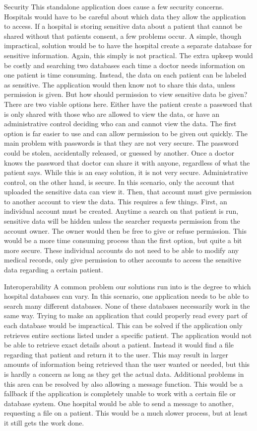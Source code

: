 \documentclass[14pt]{article}
\begin{document}
Security
This standalone application does cause a few security concerns. Hospitals would have to be careful about which data they allow the application to access. If a hospital is storing sensitive data about a patient that cannot be shared without that patients consent, a few problems occur. A simple, though impractical, solution would be to have the hospital create a separate database for sensitive information. Again, this simply is not practical. The extra upkeep would be costly and searching two databases each time a doctor needs information on one patient is time consuming. Instead, the data on each patient can be labeled as sensitive. The application would then know not to share this data, unless permission is given. But how should permission to view sensitive data be given? There are two viable options here. Either have the patient create a password that is only shared with those who are allowed to view the data, or have an administrative control deciding who can and cannot view the data. The first option is far easier to use and can allow permission to be given out quickly. The main problem with passwords is that they are not very secure. The password could be stolen, accidentally released, or guessed by another. Once a doctor knows the password that doctor can share it with anyone, regardless of what the patient says. While this is an easy solution, it is not very secure. Administrative control, on the other hand, is secure. In this scenario, only the account that uploaded the sensitive data can view it. Then, that account must give permission to another account to view the data. This requires a few things. First, an individual account must be created. Anytime a search on that patient is run, sensitive data will be hidden unless the searcher requests permission from the account owner. The owner would then be free to give or refuse permission. This would be a more time consuming process than the first option, but quite a bit more secure. These individual accounts do not need to be able to modify any medical records, only give permission to other accounts to access the sensitive data regarding a certain patient.

Interoperability
A common problem our solutions run into is the degree to which hospital databases can vary. In this scenario, one application needs to be able to search many different databases. None of these databases necessarily work in the same way. Trying to make an application that could properly read every part of each database would be impractical. This can be solved if the application only retrieves entire sections listed under a specific patient. The application would not be able to retrieve exact details about a patient. Instead it would find a file regarding that patient and return it to the user. This may result in larger amounts of information being retrieved than the user wanted or needed, but this is hardly a concern as long as they get the actual data.
Additional problems in this area can be resolved by also allowing a message function. This would be a fallback if the application is completely unable to work with a certain file or database system. One hospital would be able to send a message to another, requesting a file on a patient. This would be a much slower process, but at least it still gets the work done.
\end{document}
